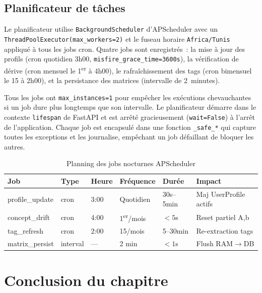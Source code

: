 \subsection{Planificateur de tâches}

Le planificateur utilise \texttt{BackgroundScheduler} d'APScheduler avec un
\texttt{ThreadPoolExecutor(max\_workers=2)} et le fuseau horaire \texttt{Africa/Tunis}
appliqué à tous les jobs cron. Quatre jobs sont enregistrés~: la mise à jour des profils
(cron quotidien 3h00, \texttt{misfire\_grace\_time=3600s}), la vérification de dérive (cron
mensuel le 1\textsuperscript{er} à 4h00), le rafraîchissement des tags (cron bimensuel le
15 à 2h00), et la persistance des matrices (intervalle de 2~minutes).

Tous les jobs ont \texttt{max\_instances=1} pour empêcher les exécutions chevauchantes si un
job dure plus longtemps que son intervalle. Le planificateur démarre dans le contexte
\texttt{lifespan} de FastAPI et est arrêté gracieusement (\texttt{wait=False}) à l'arrêt
de l'application. Chaque job est encapsulé dans une fonction \texttt{\_safe\_*} qui capture
toutes les exceptions et les journalise, empêchant un job défaillant de bloquer les autres.

\begin{table}[H]
    \centering
    \caption{Planning des jobs nocturnes APScheduler}
    \label{tab:scheduler_jobs}
    \small
    \begin{tabular}{p{3cm} p{1.5cm} p{1.8cm} p{2cm} p{2cm} p{3cm}}
        \toprule
        \textbf{Job} & \textbf{Type} & \textbf{Heure} & \textbf{Fréquence} &
        \textbf{Durée} & \textbf{Impact} \\
        \midrule
        profile\_update & cron & 3:00 & Quotidien & 30s--5min & Maj UserProfile actifs \\[2pt]
        concept\_drift & cron & 4:00 & 1\textsuperscript{er}/mois & $<5$s & Reset partiel A,b \\[2pt]
        tag\_refresh & cron & 2:00 & 15/mois & 5--30min & Re-extraction tags \\[2pt]
        matrix\_persist & interval & — & 2 min & $<1$s & Flush RAM$\rightarrow$DB \\
        \bottomrule
    \end{tabular}
\end{table}


\section*{Conclusion du chapitre}

